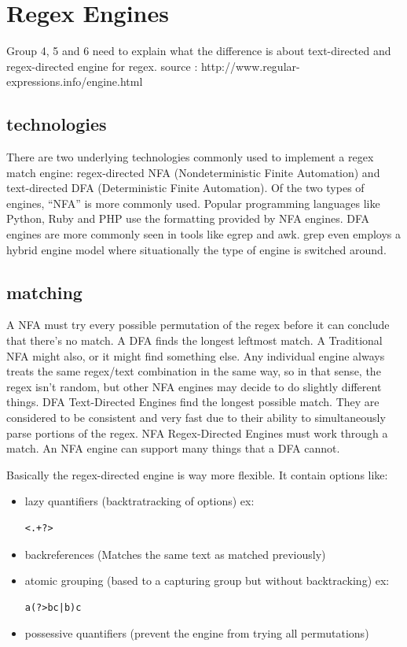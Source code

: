 \section{Regex Engines}
Group 4, 5 and 6 need to explain what the difference is about text-directed and regex-directed engine for regex.
source : http://www.regular-expressions.info/engine.html

\subsection{technologies}
There are two underlying technologies commonly used to implement a regex match 
engine: regex-directed NFA (Nondeterministic Finite Automation) and 
text-directed DFA (Deterministic Finite Automation). Of the two types of 
engines, “NFA” is more commonly used. Popular programming languages like Python, Ruby 
and PHP use the formatting provided by NFA engines. DFA engines are more commonly seen 
in tools like egrep and awk. grep even employs a hybrid engine model where situationally 
the type of engine is switched around.

\subsection{matching}
A NFA must try every possible permutation of the regex before it can conclude that there's 
no match. A DFA finds the longest leftmost match. A Traditional NFA might also, or it might find something 
else. Any individual engine always treats the same regex/text combination in the 
same way, so in that sense, the regex isn't random, but other NFA engines may 
decide to do slightly different things. DFA Text-Directed Engines find the longest 
possible match. They are considered to be consistent and very fast due to their 
ability to simultaneously parse portions of the regex. NFA Regex-Directed Engines 
must work through a match. An NFA engine can support many things that a DFA cannot. 

Basically the regex-directed engine is way more flexible.
It contain options like:
\begin{itemize}
  \item lazy quantifiers (backtratracking of options) ex: \begin{verbatim}<.+?>\end{verbatim}
  \item backreferences (Matches the same text as matched previously)
  \item atomic grouping (based to a capturing group but without backtracking) ex: \begin{verbatim}a(?>bc|b)c\end{verbatim}
  \item possessive quantifiers (prevent the engine from trying all permutations)
\end{itemize}

